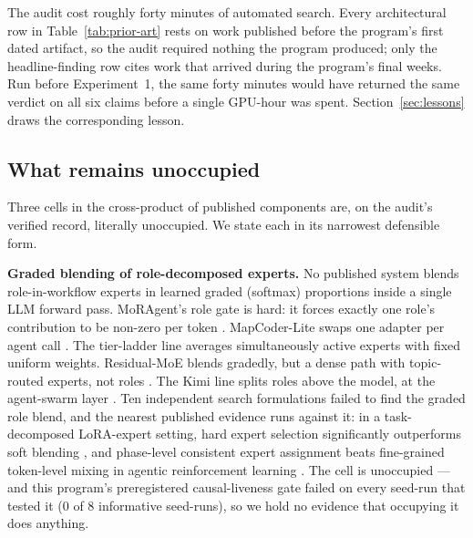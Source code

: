 \documentclass[10pt,a4paper]{article}
\newcommand{\fail}[1]{\textcolor{failred}{#1}}
\begin{document}
The audit cost roughly forty minutes of automated search. Every architectural row in Table~\ref{tab:prior-art} rests on work published before the program's first dated artifact, so the audit required nothing the program produced; only the headline-finding row cites work that arrived during the program's final weeks. Run before Experiment~1, the same forty minutes would have returned the same verdict on all six claims before a single GPU-hour was spent. Section~\ref{sec:lessons} draws the corresponding lesson.

\subsection{What remains unoccupied}\label{sec:residuals}

Three cells in the cross-product of published components are, on the audit's verified record, literally unoccupied. We state each in its narrowest defensible form.

\textbf{Graded blending of role-decomposed experts.} No published system blends role-in-workflow experts in learned graded (softmax) proportions inside a single LLM forward pass. MoRAgent's role gate is hard: it forces exactly one role's contribution to be non-zero per token \cite{han2025moragent}. MapCoder-Lite swaps one adapter per agent call \cite{lee2025mapcoderlite}. The tier-ladder line averages simultaneously active experts with fixed uniform weights. Residual-MoE blends gradedly, but a dense path with topic-routed experts, not roles \cite{rajbhandari2022}. The Kimi line splits roles above the model, at the agent-swarm layer \cite{kimik2report,marktechpost2026k26}. Ten independent search formulations failed to find the graded role blend, and the nearest published evidence runs against it: in a task-decomposed LoRA-expert setting, hard expert selection significantly outperforms soft blending \cite{taetz2026continual}, and phase-level consistent expert assignment beats fine-grained token-level mixing in agentic reinforcement learning \cite{yang2026pamoe}. The cell is unoccupied --- and this program's preregistered causal-liveness gate \fail{failed on every seed-run that tested it} (0 of 8 informative seed-runs), so we hold no evidence that occupying it does anything.
\end{document}

